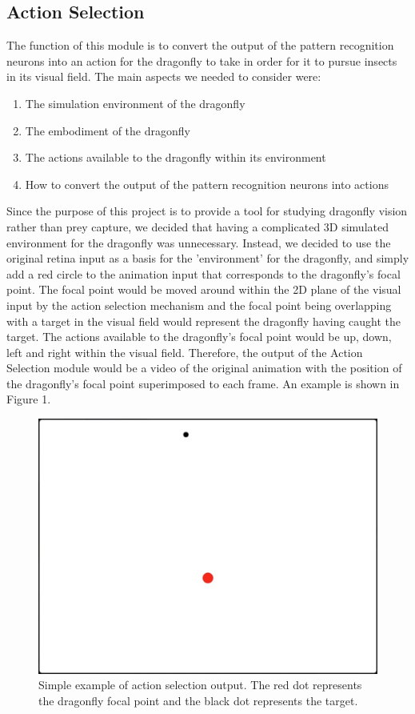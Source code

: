 \documentclass[a4paper,11pt]{article}
\begin{document}
\subsection{Action Selection}

The function of this module is to convert the output of the pattern recognition neurons into an action for the dragonfly to take in order for it to pursue insects in its visual field.
The main aspects we needed to consider were:
\begin{enumerate}
	\item The simulation environment of the dragonfly
	\item The embodiment of the dragonfly
	\item The actions available to the dragonfly within its environment
	\item How to convert the output of the pattern recognition neurons into actions
\end{enumerate}
Since the purpose of this project is to provide a tool for studying dragonfly vision rather than prey capture, we decided that having a complicated 3D simulated environment for the dragonfly was unnecessary. Instead, we decided to use the original retina input as a basis for the 'environment' for the dragonfly, and simply add a red circle to the animation input that corresponds to the dragonfly's focal point. The focal point would be moved around within the 2D plane of the visual input by the action selection mechanism and the focal point being overlapping with a target in the visual field would represent the dragonfly having caught the target. The actions available to the dragonfly's focal point would be up, down, left and right within the visual field. Therefore, the output of the Action Selection module would be a video of the original animation with the position of the dragonfly's focal point superimposed to each frame. An example is shown in Figure 1.

\begin{figure}[H]
\centering
\includegraphics[scale = 0.3]{as_example}
\caption{Simple example of action selection output. The red dot represents the dragonfly focal point and the black dot represents the target.}
\end{figure}
\end{document}
